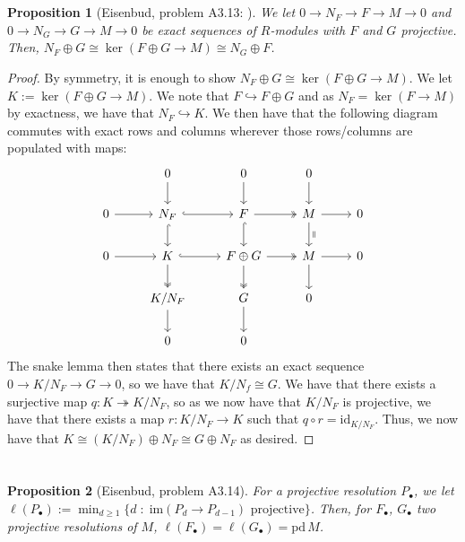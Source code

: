 \documentclass[english]{article}
\newcommand{\prob}[1]{\setcounter{section}{#1-1}\section{}}
\newtheorem*{prop*}{Proposition}
\theoremstyle{remark}
\theoremstyle{definition}
\newcommand{\id}{\mathrm{id}}
\newcommand{\im}{\mathrm{im}}
\newcommand{\pd}{\mathrm{pd}\,}
\begin{document}
\prob{29}\begin{prop*}[Eisenbud, problem A3.13: ]
	We let $0\to N_F\to F \to M\to 0$ and $0\to N_G\to G \to M\to 0$ be exact sequences of $R$-modules with $F$ and $G$ projective. Then, $N_F\oplus G\cong \ker(F\oplus G\to M)\cong N_G\oplus F$.
\end{prop*}
\begin{proof}
	By symmetry, it is enough to show  $N_F\oplus G\cong \ker(F\oplus G\to M)$. We let $K:=\ker(F\oplus G\to M)$. We note that $F\hookrightarrow F\oplus G$ and as $N_F=\ker (F\to M)$ by exactness, we have that $N_F\hookrightarrow K$. We then have that the following diagram commutes with exact rows and columns wherever those rows/columns are populated with maps:
$$	\begin{tikzcd}
	&0\arrow[d]&0\arrow[d]&0\arrow[d]&\\
	0\arrow[r]& N_F\arrow[r,hookrightarrow]\arrow[d,hookrightarrow] &F \arrow[r,twoheadrightarrow]\arrow[d,hookrightarrow] &M\arrow[r]\arrow{d}[sloped,above,leftrightarrow]{=}& 0\\
	0\arrow[r]& K\arrow[r,hookrightarrow]\arrow[d,twoheadrightarrow] &F\oplus G \arrow[r,twoheadrightarrow]\arrow[d,twoheadrightarrow] &M\arrow[r]\arrow[d]& 0\\
	&K/N_F\arrow[d]&G\arrow[d]&0&\\
	&0&0&&
	\end{tikzcd}
	$$
	The snake lemma then states that there exists an exact sequence $0\to K/N_F\to G\to 0$, so we have that $K/N_f\cong G$. We have that there exists a surjective map $q:K\twoheadrightarrow K/N_F$, so as we now have that $K/N_F$ is projective, we have that there exists a map $r:K/N_F\to K$ such that $q\circ r=\id_{K/N_F}$. Thus, we now have that $K\cong(K/N_F)\oplus N_F\cong G\oplus N_F$ as desired.
\end{proof}
\prob{30}\begin{prop*}[Eisenbud, problem A3.14]
	For a projective resolution $P_\bullet$, we let $\ell(P_\bullet):=\min_{d\geq 1}\{d\;:\;\im(P_d\to P_{d-1})\text{ projective}\}$. Then, for $F_\bullet$, $G_\bullet$ two projective resolutions of $M$, $\ell(F_\bullet)=\ell(G_\bullet)=\pd M$. 
\end{prop*}
\end{document}
